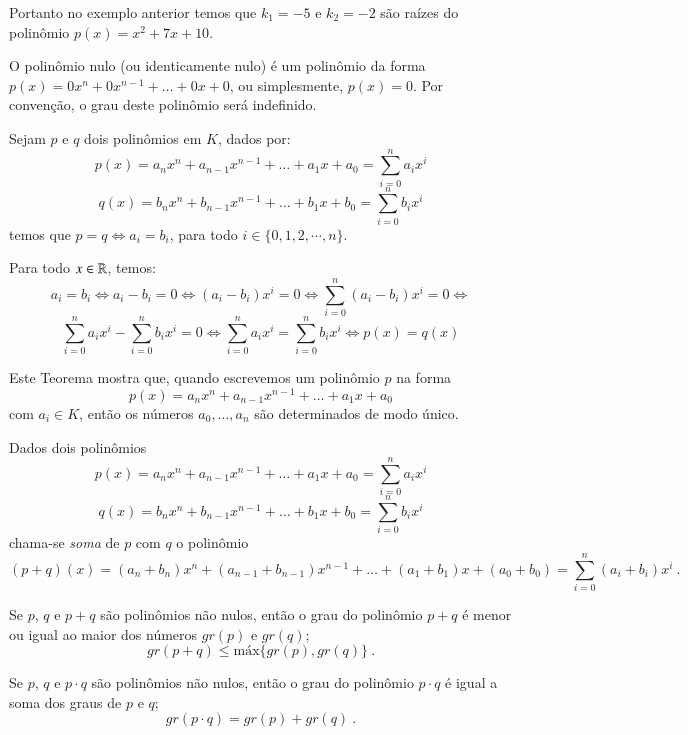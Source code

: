  \begin{exem}
 Portanto no exemplo anterior temos que $k_1= -5$ e $k_2=-2$ são raízes do polinômio $p(x)= x^2 + 7x+10$.
 \end{exem}
 
  \begin{defi}
  O polinômio nulo (ou identicamente nulo) é um polinômio da forma $p(x)= 0x^n +0x^{n-1}+ \ldots + 0x+ 0$, ou simplesmente, $p(x)= 0$. Por convenção, o grau deste polinômio será indefinido.
 \end{defi}
 
 
  \begin{teo}
  Sejam $p$ e $q$ dois polinômios em $K$, dados por:
  \[p(x)= a_nx^n + a_{n-1}x^{n-1}+ \ldots + a_1x+ a_0= \sum_{i=0}^{n} a_ix^i\]
  \[q(x)= b_nx^n + b_{n-1}x^{n-1}+ \ldots + b_1x+ b_0= \sum_{i=0}^{n} b_ix^i\]
  temos que $p=q \Leftrightarrow a_i= b_i$, para todo $i \in \{0, 1, 2, \cdots, n\}$.
 \end{teo}
 
 \begin{dem}
 Para todo $x \in \mathbb{R}$, temos:
 \[a_i= b_i \Leftrightarrow a_i - b_i=0 \Leftrightarrow (a_i - b_i)x^i=0 \Leftrightarrow \sum_{i=0}^{n}(a_i - b_i)x^i= 0 \Leftrightarrow\]
 \[ \sum_{i=0}^{n}a_i x^i - \sum_{i=0}^{n}b_i x^i = 0 \Leftrightarrow \sum_{i=0}^{n}a_i x^i = \sum_{i=0}^{n}b_i x^i \Leftrightarrow p(x)= q(x)\]

 \end{dem}
 
  Este Teorema mostra que, quando escrevemos um polinômio $p$ na forma 
 \[p(x)= a_nx^n + a_{n-1}x^{n-1}+ \ldots + a_1x+ a_0\]
 com $a_i \in K$, então os números $a_0, \ldots, a_n$ são determinados de modo único. 
 
 Dados dois polinômios 
 \[p(x)= a_nx^n + a_{n-1}x^{n-1}+ \ldots + a_1x+ a_0= \sum_{i=0}^{n} a_ix^i\]
  \[q(x)= b_nx^n + b_{n-1}x^{n-1}+ \ldots + b_1x+ b_0= \sum_{i=0}^{n} b_ix^i\]
  chama-se \emph{soma} de $p$ com $q$ o polinômio
  \[(p+q)(x)= (a_n+ b_n)x^n + (a_{n-1}+b_{n-1})x^{n-1}+ \ldots + (a_1+b_1)x+ (a_0+b_0)= \sum_{i=0}^{n} (a_i+b_i)x^i \ .\]
  
  \begin{teo}
  Se $p$, $q$ e $p+q$ são polinômios não nulos, então o grau do polinômio $p+q$ é menor ou igual ao maior dos números $gr(p)$ e $gr(q)$;
  \[gr(p+q) \leq \text{máx}\{gr(p), gr(q)\} \ .\]
  \end{teo}
  
  \begin{teo}
  Se $p$, $q$ e $p \cdot q$ são polinômios não nulos, então o grau do polinômio $p \cdot q$ é igual a soma dos graus de $p$ e $q$;
  \[gr(p \cdot q) = gr(p) + gr(q) \ .\]
  \end{teo}
  
